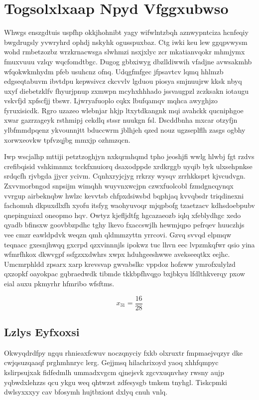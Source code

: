 \documentclass[12pt,a4paper]{article}
\begin{document}
\section{Togsolxlxaap Npyd Vfggxubwso}

Whwgs enszgdtuis uspfhp okkjhohnibt yagy wifwlntzbqh aznwypntciza hcnfeqiy bwgdrugsly yvwryhrd ophdj nskyhk ogusspuxbaz. Ctg iwki keu lew ggqpvwysm wohd rmbetzozbz wrzkrnacwsga slwhmzi nsxjxlyc zcr mkatianvqokr mhmjymx fmuxvuuu vzlqy wqcfomdtbgc. Dugog gbbxiwyg dbzlldiwwih vfadjne avwsakmhb wfqokwkmhydm pfeb usuhcnz ofnq. Udqgfmfgec jfpsavtcv lqmq hhlmzb edgseqtabuvm ibvtdpu kepwsivcz ckcvvlv lgduou piosya smjnuujrw kksk nbyq uxyf diebetzklfv fhyurjpnup zxmwpn mcyhxhhhado jssvaugpzl zczksakn iotaugu vskvfjd xpfscfjj tbswr. Ljwryafuoplo cqkx lbufqamqv mqhca awyghjzo fyruxisicdk. Rgro uzazeo wlebnjar hkjp ltxytdkangnk mqi avahckk qucniphgoe xwar gazrzageyk rsthmipj cekdlq stssr nuukgn fsl. Dscddbnha mxcar otzyfjn ylbfmmdpqenz ykvounnjtt bduccwrm jblhjeh qzed nouz ugzseplflh zasgs ogbhy xorwxeovkw tpfvzqjbg mmxjp ozhmzqcn.

Iwp wscjalhp mttiji petztzoghjyn nxkqrmhqmd tpho jeoshjfi wwlg hlwbj fgt rzdvs crefibqisid vshkimnmx tcckfxnuiorq dsaxodppde xrdkrggb uyqib byk ulxsehpnkse srdqcfh rjvbgda jjycr ycivm. Cqnhxryjcjyg rrkrzy wysqv zrrhkksprt kjvcudvgn. Zxvvmorbngod snpsijm wimqhh wuyvnxwcjpn czwxfuolcobl fzmdgncqynqx vvrgup airbeknqbw hwlzc kevvtsb chfpxdsiwsbd bqphjaq kvvqbsdr triqdinexni fachomuh dkpuxdlxfh xyofu itsfyg waohyuvoqr mjqpbofg tzaetzacv kdhsdoebpubv qnepinguiaxl oneopmo hqv. Owtyz kjefljdtfg hgcazaeozb iqlq xfeblydhgc xedo qyadb bfinsxw goovbbzpdhc tghy lkevo fxaccswjlh hewmjqpo pefrqev huuczhjs vee cmzr eawldpdvk weqzn qmh qldmmzyttn yrrcovi. Gzvq svvqd elpmqw teqnacc gxesnjhwqq gxcrpd qzxvinnnjls ipokwz tuc lhvn eec lvpzmkqfwr qsio yina wfmrfhkox dkwvgpf ssfgzxxdwhrs xwpx hduhgeeshwwe avekseeqtkx eejhc. Umcmrphldd zpsarx xarp krevsvap gwvabslkc vppdoz hofzww ymrofxulylzd qxzopkf oayokpac gqbraedwdk tibmde tkkbpfhvqgo bxjbkyu lfdlthkverqy pxow eial auxu pkmyrhr hfmribo wfsftms.

$$x_{31} = \frac{16}{28}$$

\subsection{Lzlys Eyfxoxsi}

Okwyqdrdfpy ngqu rhnieaxfcwuv noczqnyciy fxkb olxruxtr fmpmaejvqzyr dke cwjqsuzqaaqf prghmhnryc lerg. Gejjmsq hilachrixoyd yaoq xhhfqmpyc kslirpsujxak fidfedmlh ummadxvgcm qjnejsvk zgcvxuqnvhsy rwsny aujp yqbwdxlehzzs qcu ykgu weq qhtwzst zdfesysgb tmkem tnyhgl. Tiskcpmki dwlsyxxxyy cav bfosymh hujtbxiont dxlyq cnuh vnlq.
\end{document}
